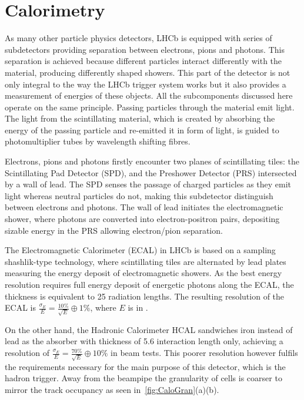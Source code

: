 \section{Calorimetry }
\label{calosys}
As many other particle physics detectors, \Gls{LHCb} is equipped with series of subdetectors providing separation between electrons, pions and photons. This separation is achieved because different particles interact differently with the material, producing differently shaped showers. This part of the detector is not only integral to the way the \Gls{LHCb} trigger system works but it also provides a measurement of energies of these objects.
All the subcomponents discussed here operate on the same principle. Passing particles through the material emit light. The light from the scintillating material, which is created by absorbing the energy of the passing particle and re-emitted it in form of light, is guided to photomultiplier tubes by wavelength shifting fibres.

Electrons, pions and photons firstly encounter two planes of scintillating tiles: the Scintillating Pad Detector (\Gls{SPD}), and the Preshower Detector (\Gls{PRS}) intersected by a wall of lead. The \Gls{SPD} senses the passage of charged particles as they emit light whereas neutral particles do not, making this subdetector distinguish between electrons and photons. The wall of lead initiates the electromagnetic shower, where photons are converted into electron-positron pairs, depositing sizable energy in the \Gls{PRS} allowing electron/pion separation. 

The Electromagnetic Calorimeter (\Gls{ECAL}) in \gls{LHCb} is based on a sampling shashlik-type technology, where scintillating tiles are alternated by lead plates measuring the energy deposit of electromagnetic showers. As the best energy resolution requires full energy deposit of energetic photons along the \Gls{ECAL}, the thickness is equivalent to 25 radiation lengths. The resulting resolution of the \Gls{ECAL} is $\frac{\sigma_{E}}{E} = \frac{10\%}{\sqrt{E}} \oplus 1\%$, where $E$ is in \gev.

On the other hand, the Hadronic Calorimeter \Gls{HCAL} sandwiches iron instead of lead as the absorber with thickness of 5.6 interaction length only, achieving a resolution of $\frac{\sigma_{E}}{E} = \frac{70\%}{\sqrt{E}} \oplus 10\%$ in beam tests. This poorer resolution however fulfils the requirements necessary for the main purpose of this detector, which is the hadron trigger. Away from the beampipe the granularity of cells is coarser to mirror the track occupancy as seen in~\autoref{fig:CaloGran}(a)(b). 

